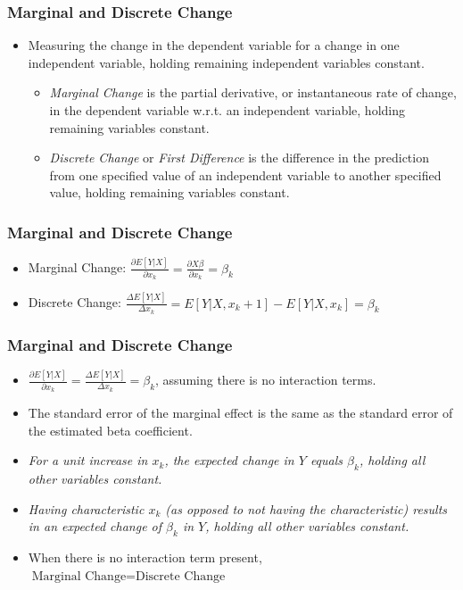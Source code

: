 \documentclass{beamer}
\begin{document}
\begin{frame}
	\frametitle{Marginal and Discrete Change}
		\begin{itemize}
			\item Measuring the change in the dependent variable for a change in one independent variable, holding remaining independent variables constant.
				\begin{itemize}
					\item \textit{Marginal Change} is the partial derivative, or instantaneous rate of change, in the dependent variable w.r.t. an independent variable, holding remaining variables constant.
					\item \textit{Discrete Change} or \textit{First Difference} is the difference in the prediction from one specified value of an independent variable to another specified value, holding remaining variables constant.
				\end{itemize}
		\end{itemize}
\end{frame}

\begin{frame}
	\frametitle{Marginal and Discrete Change}
		\begin{itemize}
			\item Marginal Change: $\frac{\partial E[Y|X]}{\partial x_{k}}=\frac{\partial X\beta}{\partial x_{k}}=\beta_{k}$
			\item Discrete Change: $\frac{\Delta E[Y|X]}{\Delta x_{k}}=E[Y|X, x_{k}+1]-E[Y|X, x_{k}]=\beta_{k}$
		\end{itemize}
\end{frame}

\begin{frame}
	\frametitle{Marginal and Discrete Change}
		\begin{itemize}
			\item $\frac{\partial E[Y|X]}{\partial x_{k}}=\frac{\Delta E[Y|X]}{\Delta x_{k}}=\beta_{k}$, assuming there is no interaction terms.
			\item The standard error of the marginal effect is the same as the standard error of the estimated beta coefficient.
			\item \textit{For a unit increase in $x_{k}$, the expected change in $Y$ equals $\beta_{k}$, holding all other variables constant.}
			\item \textit{Having characteristic $x_{k}$ (as opposed to not having the characteristic) results in an expected change of $\beta_{k}$ in $Y$, holding all other variables constant.}
			\item When there is no interaction term present, $\mbox{Marginal Change}=\mbox{Discrete Change}$
		\end{itemize}
\end{frame}
\end{document}
